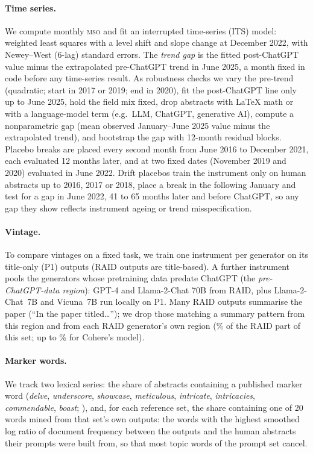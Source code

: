 \documentclass[11pt]{article}
\newcommand{\mso}{\textsc{mso}}
\begin{document}
\paragraph{Time series.}
We compute monthly \mso{} and fit an interrupted time-series (ITS) model: weighted least squares with a level shift and
slope change at December 2022, with Newey--West (6-lag) standard errors. The \emph{trend gap} is the fitted
post-ChatGPT value minus the extrapolated pre-ChatGPT trend in June 2025, a month fixed in code before any
time-series result. As robustness checks we vary the pre-trend (quadratic; start in 2017 or 2019; end in 2020),
fit the post-ChatGPT line only up to June 2025, hold the field mix fixed, drop abstracts with LaTeX math or with a language-model term (e.g.\ LLM, ChatGPT, generative AI), compute a nonparametric gap (mean observed January--June 2025 value minus the extrapolated trend), and bootstrap
the gap with 12-month residual blocks. Placebo breaks are placed every second month from June 2016 to December
2021, each evaluated 12 months later, and at two fixed dates (November 2019 and 2020) evaluated in June 2022. Drift placebos train the instrument only on human abstracts up to 2016, 2017 or 2018, place a break in the following January and test for a gap in June 2022, 41 to 65 months later and before ChatGPT, so any gap they show reflects instrument ageing or trend misspecification.

\paragraph{Vintage.}
To compare vintages on a fixed task, we train one instrument per generator on its title-only (P1) outputs (RAID outputs are title-based). A further instrument pools the generators whose pretraining data predate ChatGPT (the \emph{pre-ChatGPT-data region}): GPT-4 and Llama-2-Chat 70B from RAID, plus Llama-2-Chat~7B and Vicuna~7B run locally on P1. Many RAID outputs summarise the paper (``In the paper titled\dots''); we drop those matching a
summary pattern from this region and from each RAID generator's own region (\% of the RAID part of this set; up to \% for Cohere's model).

\paragraph{Marker words.}
We track two lexical series: the share of abstracts containing a published marker word (\emph{delve},
\emph{underscore}, \emph{showcase}, \emph{meticulous}, \emph{intricate}, \emph{intricacies},
\emph{commendable}, \emph{boast}; \citealp{kobak2025, gray2024, yakura2024}), and, for each reference set, the
share containing one of 20 words mined from that set's own outputs: the words with the highest smoothed log
ratio of document frequency between the outputs and the human abstracts their prompts were built from, so that
most topic words of the prompt set cancel.
\end{document}
